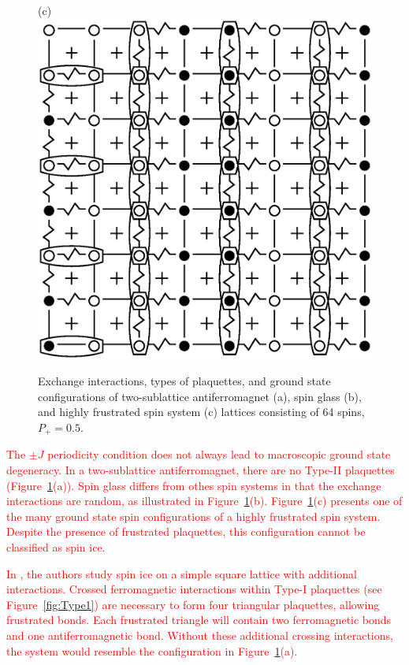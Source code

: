 \documentclass[preprint,12pt]{elsarticle}
\begin{document}
\begin{figure}[H]
\begin{minipage}[h]{0.3\linewidth}
		\end{minipage}
		\hfill
		\begin{minipage}[h]{0.3\linewidth}
			\centering(c)
			\includegraphics[width=1\linewidth]{pictures/SI_64_J0}
		\end{minipage}
		\hfill
		\caption{Exchange interactions, types of plaquettes, and ground state configurations of two-sublattice antiferromagnet (a), spin glass (b), and highly frustrated spin system (c) lattices consisting of 64 spins, $P_+ = 0.5$.}
		\label{fig:cell_SI_SG_64}
		
	\end{figure}
	

	\textcolor{red}{The $\pm J$ periodicity condition does not always lead to macroscopic ground state degeneracy. In a two-sublattice antiferromagnet, there are no Type-II plaquettes (Figure~\ref{fig:cell_SI_SG_64}(a)).}	
	\textcolor{red}{Spin glass differs from othes spin systems in that the exchange interactions are random, as illustrated in Figure~\ref{fig:cell_SI_SG_64}(b).}
	\textcolor{red}{Figure~\ref{fig:cell_SI_SG_64}(c) presents one of the many ground state spin configurations of a highly frustrated spin system. Despite the presence of frustrated plaquettes, this configuration cannot be classified as spin ice.}

	\textcolor{red}{In \cite{grigera2018entropy}, the authors study spin ice on a simple square lattice with additional interactions. Crossed ferromagnetic interactions within Type-I plaquettes (see Figure~\ref{fig:Type1}) are necessary to form four triangular plaquettes, allowing frustrated bonds. Each frustrated triangle will contain two ferromagnetic bonds and one antiferromagnetic bond. Without these additional crossing interactions, the system would resemble the configuration in Figure~\ref{fig:cell_SI_SG_64}(a).}
\end{document}
